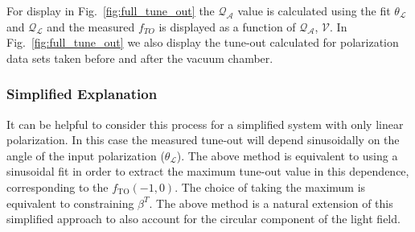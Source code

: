 \documentclass[%
 amsmath,amssymb,
aps,
]{revtex4-2}
\newcommand{\brycecom}[1]{{\color{ProcessBlue}[BMH:{#1}]\normalcolor}} %
\begin{document}
For display in Fig.~\ref{fig:full_tune_out} the $\mathcal{Q_{A}}$ value is calculated using the fit $\theta_{\mathcal{L}}$ and $\mathcal{Q_{L}}$ and the measured \(f_{TO}\) is displayed as a function of $\mathcal{Q_{A}}$, $\mathcal{V}$. In Fig.~\ref{fig:full_tune_out} we also display the tune-out calculated for polarization data sets taken before and after the vacuum chamber.%

\subsubsection{Simplified Explanation}
It can be helpful to consider this process for a simplified system with only linear polarization. In this case the measured tune-out will depend sinusoidally on the angle of the input polarization (\(\theta_{\mathcal{L}}\)). The above method is equivalent to using a sinusoidal fit in order to extract the maximum tune-out value in this dependence, corresponding to the \(f_{\mathrm{TO}}(-1,0)\). The choice of taking the maximum is equivalent to constraining \( \beta^T \). The above method is a natural extension of this simplified approach to also account for the circular component of the light field.





\end{document}
